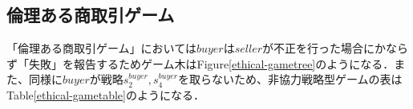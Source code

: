 %

\subsection{倫理ある商取引ゲーム}
「倫理ある商取引ゲーム」においては$buyer$は$seller$が不正を行った場合にかならず「失敗」を報告するためゲーム木はFigure\ref{ethical-gametree}のようになる．また、同様に$buyer$が戦略$s^{buyer}_2, s^{buyer}_4$を取らないため、非協力戦略型ゲームの表はTable\ref{ethical-gametable}のようになる．


